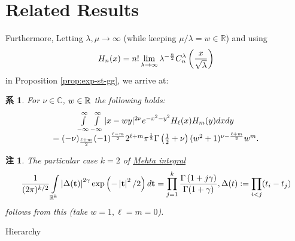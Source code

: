 \documentclass[pdf,notes]{beamer}
\newtheorem{remark}{注}
\newtheorem{cor}{系}
\begin{document}
\section{Related Results}
\begin{frame}
	Furthermore,
	Letting $\lambda,\mu\to\infty$ (while keeping $\mu/\lambda=w\in\mathbb{R}$) and using
	\vspace{-0.3cm}
	\begin{equation*}
			H_n (x) = n! \lim_{\lambda \rightarrow \infty} \lambda^{- \frac{n}{2}}
			C_n^{\lambda} \left( \frac{x}{\sqrt{\lambda}} \right)
	\vspace{-0.4cm}
	\end{equation*}
	in Proposition \ref{prop:exp-st-gg}, we arrive at:
	\begin{cor}\label{cor:int-xzy-hh}
		For $\nu\in\mathbb{C}$, $w\in\R$ the following holds:
		\begin{equation*}
			\begin{array}[]{c}
			\int_{- \infty}^{\infty} \int_{- \infty}^{\infty} | x - w y |^{2 \nu} e^{-
			x^2 - y^2} H_\ell (x) H_m (y) d x d y \\= (- \nu)_{\frac{\ell + m}{2}} (- 1)^{\frac{\ell
			- m}{2}} 2^{\ell + m} \pi^{\frac{1}{2}} \Gamma \left( \frac{1}{2} + \nu \right)
			(w^2 + 1)^{\nu - \frac{\ell + m}{2}} w^m .
			\end{array}
		\end{equation*}
	\end{cor}
	\begin{remark}
		The particular case $k=2$ of \underline{Mehta integral}
	\vspace{-0.3cm}
		\begin{equation*}
			\frac{1}{(2\pi)^{k/2}}\int_{\mathbb{R}^k}\myabs{\Delta(\mathbf{t})}^{2\gamma}\exp\left( -\myabs{\mathbf{t}}^2/2 \right)d\mathbf{t}=\prod_{j=1}^k\frac{\Gamma\left( 
			1+j\gamma\right)}{\Gamma(1+\gamma)},\Delta(t):=\prod_{i<j}(t_i-t_j)
	\vspace{-0.4cm}
		\end{equation*}
		follows from this (take $w=1,\ell=m=0$).
	\end{remark}
\end{frame}
\begin{frame}[fragile]{Hierarchy}
\begin{tikzpicture}

\end{tikzpicture}
\end{frame}
\end{document}

